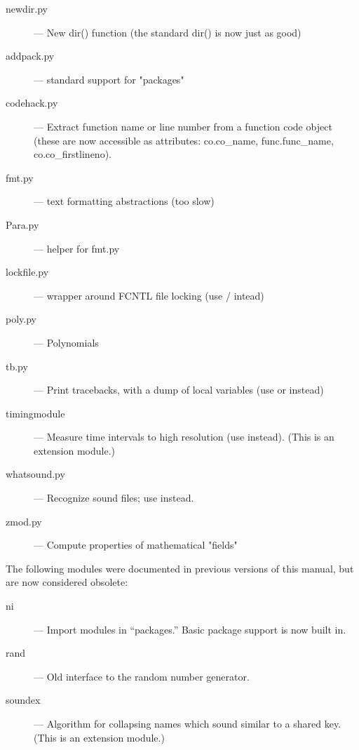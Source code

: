 \begin{description}
\item[newdir.py]
--- New dir() function (the standard dir() is now just as good)

\item[addpack.py]
--- standard support for "packages"

\item[codehack.py]
--- Extract function name or line number from a function
code object (these are now accessible as attributes: co.co_name,
func.func_name, co.co_firstlineno).

\item[fmt.py]
--- text formatting abstractions (too slow)

\item[Para.py]
--- helper for fmt.py

\item[lockfile.py]
--- wrapper around FCNTL file locking (use
/ intead)

\item[poly.py]
--- Polynomials

\item[tb.py]
--- Print tracebacks, with a dump of local variables (use
 or  instead)

\item[timingmodule]
--- Measure time intervals to high resolution (use
 instead).  (This is an extension module.)

\item[whatsound.py]
--- Recognize sound files; use  instead.

\item[zmod.py]
--- Compute properties of mathematical "fields"
\end{description}

The following modules were documented in previous versions of this
manual, but are now considered obsolete:

\begin{description}
\item[ni]
--- Import modules in ``packages.''  Basic package support is now
built in.

\item[rand]
--- Old interface to the random number generator.

\item[soundex]
--- Algorithm for collapsing names which sound similar to a shared
key.  (This is an extension module.)
\end{description}


